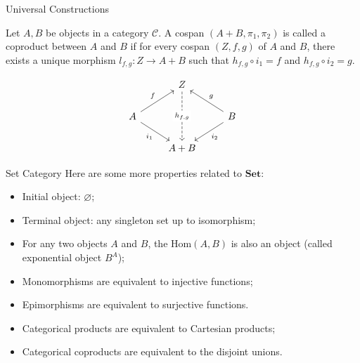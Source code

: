 \documentclass[aspectratio=169,xcolor=dvipsnames,10pt]{beamer}
\theoremstyle{definition}
\begin{document}
\begin{frame}[fragile]{Universal Constructions}
    \begin{definition}
        Let $A,B$ be objects in a  category $\mathcal C$. A cospan $(A + B, \pi_1, \pi_2)$
        is called a coproduct between $A$ and $B$ if for every cospan $(Z, f, g)$ of $A$ and $B$,
        there exists a unique morphism $l_{f,g}:Z \to A + B$ such that
        $h_{f,g} \circ i_1 = f$ and $h_{f,g} \circ i_2 = g$.
    \end{definition}
    \[\begin{tikzcd}
        & Z \\
        A && B \\
        & {A + B}
        \arrow["{h_{f,g}}"{description}, dashed, from=1-2, to=3-2]
        \arrow["f", from=2-1, to=1-2]
        \arrow["{i_1}"', from=2-1, to=3-2]
        \arrow["g"', from=2-3, to=1-2]
        \arrow["{i_2}", from=2-3, to=3-2]
    \end{tikzcd}\]
\end{frame}

\begin{frame}[fragile]{Set Category}
    Here are some more properties related to $\mathbf{Set}$:
    \begin{itemize}
        \item Initial object: $\varnothing$;
        \item Terminal object: any singleton set up to isomorphism;
        \item For any two objects $A$ and $B$, the $\text{Hom}(A,B)$ is also an object (called exponential object $B^A$);
        \item Monomorphisms are equivalent to injective functions;
        \item Epimorphisms are equivalent to surjective functions.
        \item Categorical products are equivalent to Cartesian products;
        \item Categorical coproducts are equivalent to the disjoint unions.
    \end{itemize}
\end{frame}
\end{document}
